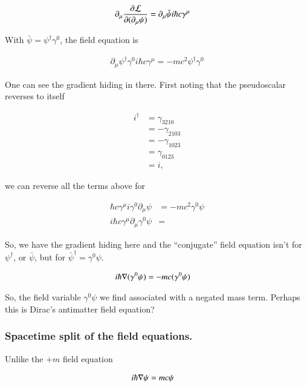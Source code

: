 \documentclass{article}
\begin{document}
\begin{align*}
\partial_\mu \frac{\partial {\mathcal{L}}}{\partial {(\partial_\mu \psi)}} 
&= \partial_\mu \bar\psi i \hbar c \gamma^\mu
\end{align*}

With $\bar\psi = \psi^\dagger \gamma^0$, the field equation is

\begin{align*}
\partial_\mu \psi^\dagger \gamma^0 i \hbar c \gamma^\mu = -m c^2 \psi^\dagger \gamma^0
\end{align*}

One can see the gradient hiding in there.  First noting that the pseudoscalar reverses to itself

\begin{align*}
i^\dagger 
&= \gamma_{3210} \\
&= -\gamma_{2103} \\
&= -\gamma_{1023} \\
&= \gamma_{0123} \\
&= i,
\end{align*}

we can reverse all the terms above for

\begin{align*}
\hbar c \gamma^\mu i \gamma^0 \partial_\mu \psi &= -m c^2 \gamma^0 \psi \\
i \hbar c \gamma^\mu \partial_\mu \gamma^0 \psi &=
\end{align*}

So, we have the gradient hiding here and the ``conjugate'' field equation isn't for $\psi^\dagger$, or $\bar \psi$, but for ${\bar\psi}^\dagger = \gamma^0 \psi$.  

\begin{align}\label{eqn:antimatter}
i \hbar \nabla (\gamma^0 \psi) &= -m c (\gamma^0 \psi)
\end{align}

So, the field variable $\gamma^0 \psi$ we find associated with a negated mass term.  Perhaps this is Dirac's antimatter field equation?

\subsubsection{ Spacetime split of the field equations. }

Unlike the $+m$ field equation

\begin{align}\label{eqn:regularMatter}
i \hbar \nabla \psi &= m c \psi
\end{align}
\end{document}
